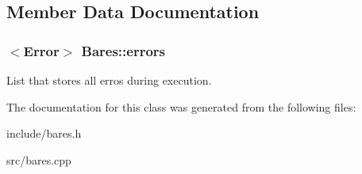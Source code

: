 \subsection{Member Data Documentation}
\subsubsection[{errors}]{$<${\bf Error}$>$ Bares\+::errors}\hypertarget{classBares_a094796228fccdb1ce41ab8ab6c2a2a4c}{}\label{classBares_a094796228fccdb1ce41ab8ab6c2a2a4c}
List that stores all erros during execution. 

The documentation for this class was generated from the following files\+:\begin{DoxyCompactItemize}
\item 
include/bares.\+h\item 
src/bares.\+cpp\end{DoxyCompactItemize}
